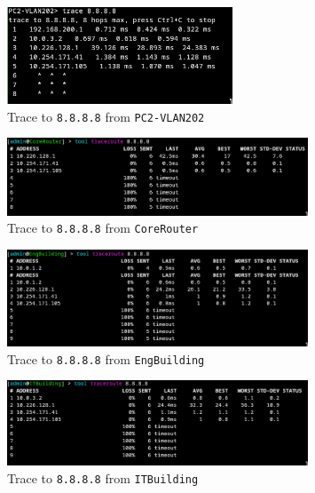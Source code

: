 \documentclass[a4paper]{article}
\begin{document}
\begin{figure}[H]
    \centering
    \includegraphics[width=0.6\textwidth]{./images/pc2_ping_internet.png}
    \caption{Trace to \texttt{8.8.8.8} from \texttt{PC2-VLAN202}}
\end{figure}

\begin{figure}[H]
    \centering
    \includegraphics[width=0.8\textwidth]{./images/core_ping_internet.png}
    \caption{Trace to \texttt{8.8.8.8} from \texttt{CoreRouter}}
\end{figure}

\begin{figure}[H]
    \centering
    \includegraphics[width=0.8\textwidth]{./images/eng_ping_internet.png}
    \caption{Trace to \texttt{8.8.8.8} from \texttt{EngBuilding}}
\end{figure}

\begin{figure}[H]
    \centering
    \includegraphics[width=0.8\textwidth]{./images/it_ping_internet.png}
    \caption{Trace to \texttt{8.8.8.8} from \texttt{ITBuilding}}
\end{figure}
\end{document}
